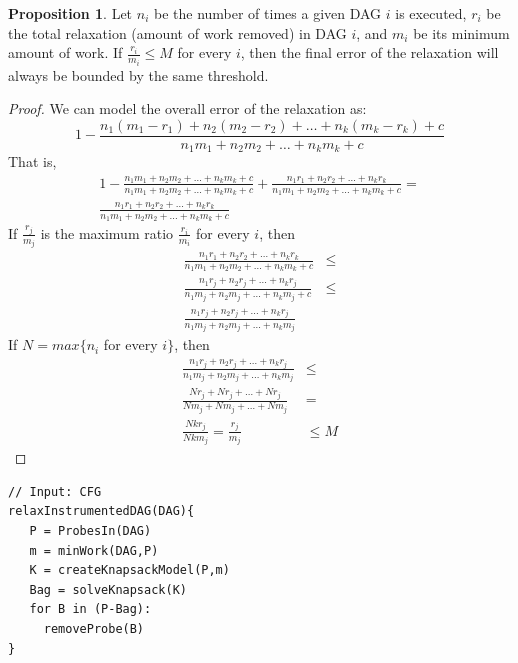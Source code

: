 \documentclass[sigplan,10pt]{acmart}
\theoremstyle{definition}
\newtheorem{prop}{Proposition}[section]
\begin{document}
\begin{prop}\label{prop:relax-bound}
Let $n_i$ be the number of times a given DAG $i$ is executed, $r_i$ be the total relaxation (amount of work removed) in DAG $i$, and $m_i$ be its minimum amount of work.
If $\frac{r_i}{m_i} \leq M$ for every $i$,
then the final error of the relaxation will always be bounded by the same threshold.
\end{prop}
\begin{proof}
We can model the overall error of the relaxation as:
\[
1 - \frac{n_1(m_1 - r_1) + n_2(m_2 - r_2) + \ldots + n_k(m_k - r_k) + c}{n_1m_1 + n_2m_2 + \ldots + n_km_k + c}
\]
That is,
\begin{gather*}
 1 - \frac{n_1m_1 + n_2m_2 + \ldots + n_km_k + c}{n_1m_1 + n_2m_2 + \ldots + n_km_k + c} + \frac{n_1r_1 + n_2r_2 + \ldots + n_kr_k}{n_1m_1 + n_2m_2 + \ldots + n_km_k + c} = \\
 \frac{n_1r_1 + n_2r_2 + \ldots + n_kr_k}{n_1m_1 + n_2m_2 + \ldots + n_km_k + c}
\end{gather*}
If $\frac{r_j}{m_j}$ is the maximum ratio $\frac{r_i}{m_i}$ for every $i$, then
\begin{equation*}
\begin{aligned}
 \frac{n_1r_1 + n_2r_2 + \ldots + n_kr_k}{n_1m_1 + n_2m_2 + \ldots + n_km_k + c} &\leq\\
 \frac{n_1r_j + n_2r_j + \ldots + n_kr_j}{n_1m_j + n_2m_j + \ldots + n_km_j + c} &\leq\\
 \frac{n_1r_j + n_2r_j + \ldots + n_kr_j}{n_1m_j + n_2m_j + \ldots + n_km_j} & 
\end{aligned}
\end{equation*}
If $N = max\{n_i$ for every $i\}$, then
\begin{equation*}
\begin{aligned}
 \frac{n_1r_j + n_2r_j + \ldots + n_kr_j}{n_1m_j + n_2m_j + \ldots + n_km_j} &\leq\\
 \frac{Nr_j + Nr_j + \ldots + Nr_j}{Nm_j + Nm_j + \ldots + Nm_j} &=\\
 \frac{Nkr_j}{Nkm_j} = \frac{r_j}{m_j} &\leq M
\end{aligned}
\end{equation*}
\end{proof}


\begin{lstlisting}[caption={Optimal placement of probes for block frequency.}, label={lst:instrumentCFG}]
// Input: CFG	
relaxInstrumentedDAG(DAG){
   P = ProbesIn(DAG)
   m = minWork(DAG,P)
   K = createKnapsackModel(P,m)
   Bag = solveKnapsack(K)
   for B in (P-Bag):
     removeProbe(B)
}
\end{lstlisting}
\end{document}
